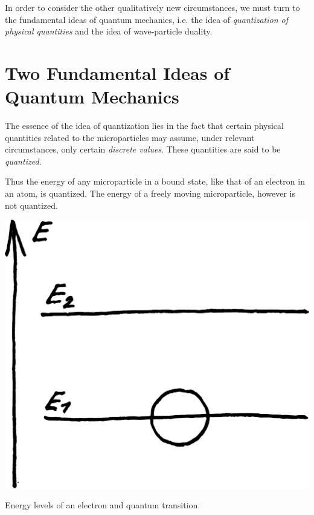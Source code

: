 \documentclass[a4paper,sfsidenotes,colorlinks=true]{tufte-book}
\numberwithin{equation}{section}
\numberwithin{figure}{section}
\begin{document}
In order to consider the other qualitatively new circumstances, we
must turn to the fundamental ideas of quantum mechanics, i.e. the idea
of \emph{quantization of physical quantities} and the idea of wave-particle
duality.

\section{Two Fundamental Ideas of Quantum Mechanics}
\label{sec-02}

The essence of the
idea of quantization lies in the fact that certain physical quantities
related to the microparticles may assume, under relevant
circumstances, only certain \emph{discrete values}. These quantities are said
to be \emph{quantized}. 

Thus the energy of any microparticle in a bound state, like that of an
electron in an atom, is quantized. The energy of a freely moving
microparticle, however is not quantized.

\begin{marginfigure}%
\centering
\includegraphics[width=0.9\linewidth]{figures/fig-02-01.pdf}
\caption{Energy levels of an electron and quantum transition.}
\label{fig-2.1}
\end{marginfigure}
\end{document}
